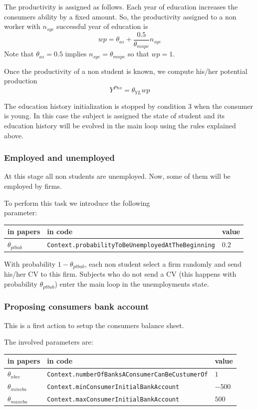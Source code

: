 \documentclass{article}
\begin{document}
The productivity is assigned as follows. Each year of education increases the consumers ability by a fixed amount. So, the productivity assigned to a non worker with  $n_{sye}$ successful year of education is
\[
	wp=\theta_{as}+\frac{0.5}{\theta_{mnpe}}n_{sye}
\]
Note that $\theta_{as}=0.5$ implies $n_{sye}=\theta_{mnpe}$ so that $wp=1$.

Once the productivity of a non student is known, we compute his/her potential production 
\[Y^{Pns}=\theta_{YL}wp\]

The education history initialization is stopped by condition 3 when the consumer is young. In this case the subject is assigned the state of student and its education history will be evolved in the main loop using the rules explained above.

\subsubsection*{Employed and unemployed}

At this stage all non students are unemployed. Now, some of them will be employed by firms. 

To perform this task we introduce the following\\
parameter:\\
\begin{tabular}{l l l}
	\hline
	in papers& in code&value\\
	\hline
	\hline
 $\theta_{ptbub}$&\verb+Context.probabilityToBeUnemployedAtTheBeginning+&$0.2$\\
	\hline
\end{tabular}

\vskip5mm
With probability $1-\theta_{ptbub}$, each non student select a firm randomly and send his/her CV to this firm. Subjects who do not send a CV (this happens with probability $\theta_{ptbub}$) enter the main loop in the unemployments state. 

\subsubsection{Proposing consumers bank account}

This is a first action to setup the consumers balance sheet. 

The involved parameters are:\\
\begin{tabular}{l l l}
	\hline
	in papers& in code&value\\
	\hline
	\hline
 $\theta_{nbcc}$&\verb+Context.numberOfBanksAConsumerCanBeCustumerOf+&$1$\\
 $\theta_{mincba}$&\verb+Context.minConsumerInitialBankAccount+&$-500$\\
 $\theta_{maxcba}$&\verb+Context.maxConsumerInitialBankAccount+&$500$\\
	\hline
\end{tabular}
\end{document}
